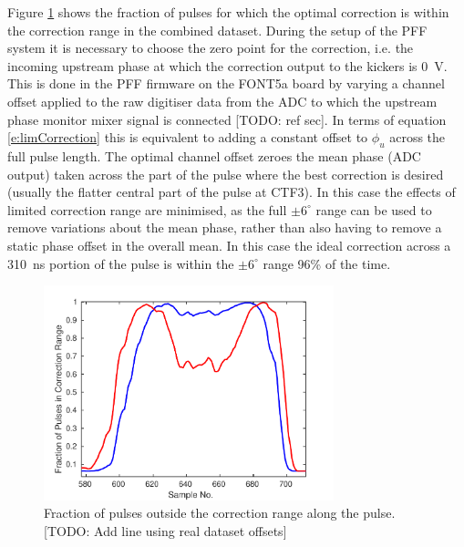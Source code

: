 Figure \ref{f:longFF_fractInRange} shows the fraction of pulses for which the optimal correction is within the correction range in the combined dataset. During the setup of the PFF system it is necessary to choose the zero point for the correction, i.e. the incoming upstream phase at which the correction output to the kickers is 0~V. This is done in the PFF firmware on the FONT5a board by varying a channel offset applied to the raw digitiser data from the ADC to which the upstream phase monitor mixer signal is connected [TODO: ref sec]. In terms of equation \ref{e:limCorrection} this is equivalent to adding a constant offset to \(\phi_u\) across the full pulse length. The optimal channel offset zeroes the mean phase (ADC output) taken across the part of the pulse where the best correction is desired (usually the flatter central part of the pulse at CTF3). In this case the effects of limited correction range are minimised, as the full \(\pm6^\circ\) range can be used to remove variations about the mean phase, rather than also having to remove a static phase offset in the overall mean. In this case the ideal correction across a 310~ns portion of the pulse is within the \(\pm6^\circ\) range 96\% of the time. 

\begin{figure}
  \centering
  \includegraphics[width=0.75\textwidth]{Figures/feedforward/longFF_fractInRange}
  \caption{Fraction of pulses outside the correction range along the pulse. [TODO: Add line using real dataset offsets]}
  \label{f:longFF_fractInRange}
\end{figure}

